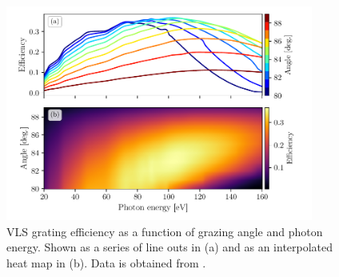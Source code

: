 \begin{figure}
	\centering
	\includegraphics[width=0.9\textwidth]{figures/Beamline/grating_efficiency.pdf}
	\caption[VLS grating efficiency as a function of incident angle and photon energy]{VLS grating efficiency as a function of grazing angle and photon energy.  Shown as a series of line outs in (a) and as an interpolated heat map in (b).  Data is obtained from \cite{hageDevelopmentXUVSpectrometer}.}
	\label{fig:grating_efficiency}
\end{figure}

